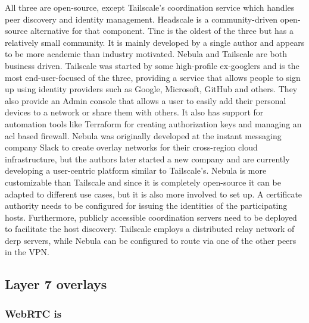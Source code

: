 All three are open-source, except Tailscale's coordination service which
handles peer discovery and identity management. Headscale
\autocite{fontJuanfontHeadscale2022} is a community-driven open-source
alternative for that component. Tinc is the oldest of the three but has
a relatively small community. It is mainly developed by a single author
and appears to be more academic than industry motivated. Nebula and
Tailscale are both business driven. Tailscale was started by some
high-profile ex-googlers and is the most end-user-focused of the three,
providing a service that allows people to sign up using identity
providers such as Google, Microsoft, GitHub and others. They also
provide an Admin console that allows a user to easily add their personal
devices to a network or share them with others. It also has support for
automation tools like Terraform for creating authorization keys and
managing an \gls{acl} based firewall. Nebula was originally developed at
the instant messaging company Slack to create overlay networks for their
cross-region cloud infrastructure, but the authors later started a new
company and are currently developing a user-centric platform similar to
Tailscale's. Nebula is more customizable than Tailscale and since it is
completely open-source it can be adapted to different use cases, but it
is also more involved to set up. A certificate authority needs to be
configured for issuing the identities of the participating hosts.
Furthermore, publicly accessible coordination servers need to be
deployed to facilitate the host discovery. Tailscale employs a
distributed relay network of \gls{derp} servers, while Nebula can be
configured to route via one of the other peers in the VPN.

\hypertarget{layer-7-overlays}{%
\subsection{Layer 7 overlays}\label{layer-7-overlays}}

\hypertarget{webrtc-is}{%
\subsubsection{WebRTC is}\label{webrtc-is}}

